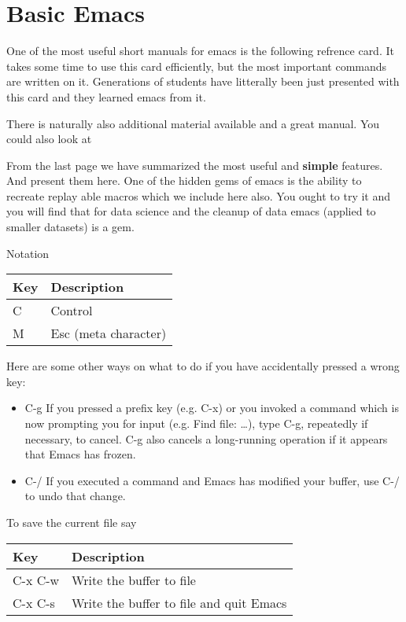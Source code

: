 \FILENAME

\section{Basic Emacs}
\label{C:emacs}

One of the most useful short manuals for emacs is the following refrence
card. It takes some time to use this card efficiently, but the most
important commands are written on it. Generations of students have
litterally been just presented with this card and they learned emacs
from it.



There is naturally also additional material available and a great
manual. You could also look at



From the last page we have summarized the most useful and
\textbf{simple} features. And present them here. One of the hidden gems
of emacs is the ability to recreate replay able macros which we include
here also. You ought to try it and you will find that for data science
and the cleanup of data emacs (applied to smaller datasets) is a gem.

Notation

\begin{longtable}[]{@{}ll@{}}
\toprule
Key & Description\tabularnewline
\midrule
\endhead
C & Control\tabularnewline
M & Esc (meta character)\tabularnewline
\bottomrule
\end{longtable}

Here are some other ways on what to do if you have accidentally
pressed a wrong key:

\begin{itemize}
\item C-g If you pressed a prefix key (e.g. C-x) or you invoked
a command which is now prompting you for input (e.g. Find file:
\ldots{}), type C-g, repeatedly if necessary, to cancel. C-g also
cancels a long-running operation if it appears that Emacs has frozen.

\item C-/ If you executed a command and Emacs has modified your buffer, use C-/ to
undo that change. 
\end{itemize}

To save the current file say 

\begin{longtable}[]{ll}
\toprule
Key & Description\tabularnewline
\midrule
\endhead
C-x C-w & Write the buffer to file \tabularnewline
C-x C-s & Write the buffer to file and quit Emacs \tabularnewline
\bottomrule
\end{longtable}


